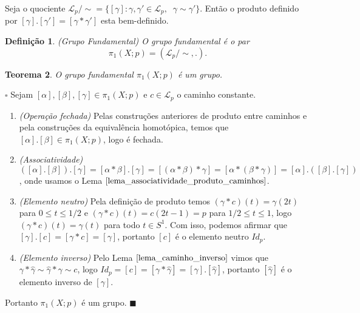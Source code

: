 \documentclass[12pt]{book}
\newtheorem{teorema}{Teorema}[section]
\newtheorem{definicao}[teorema]{Definição}
\newenvironment{prova}[1]{$\square$ #1}{\hfill$\blacksquare$}
\newcommand{\caminhospontobase}[1]{\mathcal{L}_{#1}}
\newcommand{\circulo}{S^{1}}
\newcommand{\classe}[1]{[#1]}
\newcommand{\grupofundamentalpontobase}[2]{\pi_{1}(#1; #2)}
\begin{document}
	Seja o quociente $\caminhospontobase{p}/\sim = \{ \classe{\gamma} : \gamma,\gamma' \in \caminhospontobase{p},\;\;\gamma \sim \gamma'\}$. Então o produto definido por $\classe{\gamma}.\classe{\gamma'} = \classe{\gamma*\gamma'}$ esta bem-definido.
	
	\begin{definicao}
		(Grupo Fundamental) O grupo fundamental é o par 
		$$
		\grupofundamentalpontobase{X}{p} = (\caminhospontobase{p}/\sim, .).
		$$
	\end{definicao}
	
	\begin{teorema}
		O grupo fundamental $\grupofundamentalpontobase{X}{p}$ é um grupo.
	\end{teorema}
	\begin{prova}
		Sejam $\classe{\alpha}, \classe{\beta}, \classe{\gamma} \in  \grupofundamentalpontobase{X}{p}$ e $c\in \caminhospontobase{p}$ o caminho constante.
		\begin{enumerate}
			\item \textit{(Operação fechada)} Pelas construções anteriores de produto entre caminhos e pela construções da equivalência homotópica, temos que $\classe{\alpha}.\classe{\beta} \in \grupofundamentalpontobase{X}{p}$, logo é fechada.
			\item \textit{(Associatividade)} $(\classe{\alpha}. \classe{\beta}). \classe{\gamma} = \classe{\alpha*\beta}. \classe{\gamma} = \classe{(\alpha*\beta)*\gamma} = \classe{\alpha*(\beta*\gamma)} = \classe{\alpha}. (\classe{\beta}. \classe{\gamma} )$, onde usamos o Lema $\ref{lema_associatividade_produto_caminhos}$.
			\item \textit{(Elemento neutro)} Pela definição de produto temos $(\gamma*c)(t) = \gamma(2t)$ para $0\leq t \leq 1/2$ e  $(\gamma*c)(t) = c(2t-1) = p$ para $1/2 \leq t \leq 1$, logo $(\gamma*c)(t) = \gamma(t)$ para todo $t \in \circulo$. Com isso, podemos afirmar que $\classe{\gamma}.\classe{c} = \classe{\gamma*c} = \classe{\gamma}$, portanto $\classe{c}$ é o elemento neutro $Id_{p}$.
			\item \textit{(Elemento inverso)} Pelo Lema $\ref{lema_caminho_inverso}$ vimos que $\gamma *\hat{\gamma} \sim \hat{\gamma} *\gamma \sim c$, logo $Id_{p} =\classe{c} =  \classe{\gamma*\hat{\gamma}} = \classe{\gamma}.\classe{\hat{\gamma}}$, portanto $\classe{\hat{\gamma}}$ é o elemento inverso de $\classe{\gamma}$.
		\end{enumerate}
		Portanto $\grupofundamentalpontobase{X}{p}$ é um grupo.
	\end{prova}
	
\end{document}
